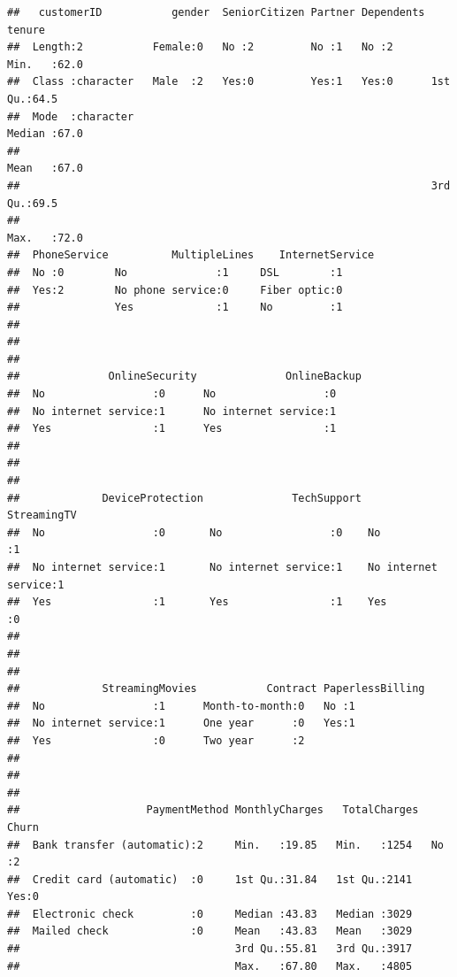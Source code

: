 \documentclass[
]{article}
\begin{document}
\begin{verbatim}
##   customerID           gender  SeniorCitizen Partner Dependents     tenure    
##  Length:2           Female:0   No :2         No :1   No :2      Min.   :62.0  
##  Class :character   Male  :2   Yes:0         Yes:1   Yes:0      1st Qu.:64.5  
##  Mode  :character                                               Median :67.0  
##                                                                 Mean   :67.0  
##                                                                 3rd Qu.:69.5  
##                                                                 Max.   :72.0  
##  PhoneService          MultipleLines    InternetService
##  No :0        No              :1     DSL        :1     
##  Yes:2        No phone service:0     Fiber optic:0     
##               Yes             :1     No         :1     
##                                                        
##                                                        
##                                                        
##              OnlineSecurity              OnlineBackup
##  No                 :0      No                 :0    
##  No internet service:1      No internet service:1    
##  Yes                :1      Yes                :1    
##                                                      
##                                                      
##                                                      
##             DeviceProtection              TechSupport              StreamingTV
##  No                 :0       No                 :0    No                 :1   
##  No internet service:1       No internet service:1    No internet service:1   
##  Yes                :1       Yes                :1    Yes                :0   
##                                                                               
##                                                                               
##                                                                               
##             StreamingMovies           Contract PaperlessBilling
##  No                 :1      Month-to-month:0   No :1           
##  No internet service:1      One year      :0   Yes:1           
##  Yes                :0      Two year      :2                   
##                                                                
##                                                                
##                                                                
##                    PaymentMethod MonthlyCharges   TotalCharges  Churn  
##  Bank transfer (automatic):2     Min.   :19.85   Min.   :1254   No :2  
##  Credit card (automatic)  :0     1st Qu.:31.84   1st Qu.:2141   Yes:0  
##  Electronic check         :0     Median :43.83   Median :3029          
##  Mailed check             :0     Mean   :43.83   Mean   :3029          
##                                  3rd Qu.:55.81   3rd Qu.:3917          
##                                  Max.   :67.80   Max.   :4805
\end{verbatim}
\end{document}
